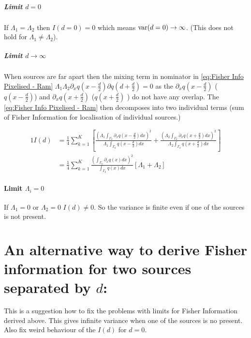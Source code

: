 \subparagraph*{Limit $d=0$}
If $\Lambda_1=\Lambda_2$ then $I(d=0)=0$ which means $\mathrm{var}(d=0)\rightarrow\infty$. (This does not hold for $\Lambda_1\neq\Lambda_2$). 

\subparagraph*{Limit $d\rightarrow\infty$}
When sources are far apart then the mixing term in nominator in \eqref{eq:Fisher Info Pixelised - Ram} $\Lambda_1\Lambda_2\partial_{x}q(x-\frac{d}{2})\partial q(d+\frac{d}{2})=0$ as the $\partial_{x}q(x-\frac{d}{2})$ ($q(x-\frac{d}{2})$) and $\partial_{x}q(x+\frac{d}{2})$ ($q(x+\frac{d}{2})$ ) do not have any overlap. The \eqref{eq:Fisher Info Pixelised - Ram} then decomposes into two individual terms (sum of Fisher Information for localisation of individual sources.) 

\begin{alignat*}{1}
	I(d) 
	& =\frac{1}{4}\sum_{k=1}^{K}\left[\frac{\left(\Lambda_1\int_{\Gamma_k}\partial_{x}q(x-\frac{d}{2})dx\right)^2}{\Lambda_1\int_{\Gamma_k}q(x-\frac{d}{2})dx}+\frac{\left(\Lambda_2\int_{\Gamma_k}\partial_{x}q(x+\frac{d}{2})dx\right)^2}{\Lambda_2\int_{\Gamma_k}q(x+\frac{d}{2})dx}\right]\\
 	& =\frac{1}{4}\sum_{k=1}^{K}\frac{\left(\int_{\Gamma_k}\partial_{x}q(x)dx\right)^2}{\int_{\Gamma_k}q(x)dx}\left[\Lambda_1+\Lambda_2\right]
\end{alignat*}

\paragraph*{Limit $\Lambda_i=0$}
If $\Lambda_1=0$ or $\Lambda_2=0$ $I(d)\neq0$. So the variance is finite even if one of the sources is not present.


\section{An alternative way to derive Fisher information for two sources separated by $d$:}
This is a suggestion how to fix the problems with limits for Fisher Information derived above. This gives infinite variance when one of the sources is no present. Also fix weird behaviour of the $I(d)$ for $d=0$. 

